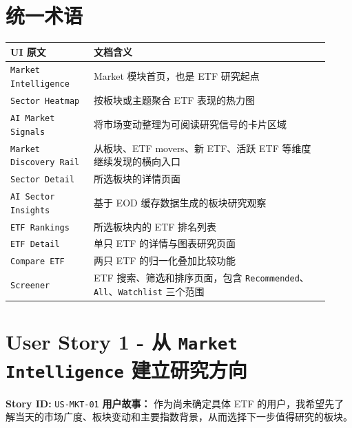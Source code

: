 \section{统一术语}
\begingroup
\small
\begin{longtable}{L{0.24\linewidth}L{0.68\linewidth}}
\toprule
\textbf{UI 原文} & \textbf{文档含义} \\
\midrule
\texttt{Market Intelligence} & Market 模块首页，也是 ETF 研究起点 \\
\texttt{Sector Heatmap} & 按板块或主题聚合 ETF 表现的热力图 \\
\texttt{AI Market Signals} & 将市场变动整理为可阅读研究信号的卡片区域 \\
\texttt{Market Discovery Rail} & 从板块、ETF movers、新 ETF、活跃 ETF 等维度继续发现的横向入口 \\
\texttt{Sector Detail} & 所选板块的详情页面 \\
\texttt{AI Sector Insights} & 基于 EOD 缓存数据生成的板块研究观察 \\
\texttt{ETF Rankings} & 所选板块内的 ETF 排名列表 \\
\texttt{ETF Detail} & 单只 ETF 的详情与图表研究页面 \\
\texttt{Compare ETF} & 两只 ETF 的归一化叠加比较功能 \\
\texttt{Screener} & ETF 搜索、筛选和排序页面，包含 \texttt{Recommended}、\texttt{All}、\texttt{Watchlist} 三个范围 \\
\bottomrule
\end{longtable}
\endgroup
\prdhr
\hypertarget{us-mkt-01}{}
\section{User Story 1 - 从 \texttt{Market Intelligence} 建立研究方向}
\textbf{Story ID:} \texttt{US-MKT-01}
\textbf{用户故事：} 作为尚未确定具体 ETF 的用户，我希望先了解当天的市场广度、板块变动和主要指数背景，从而选择下一步值得研究的板块。
